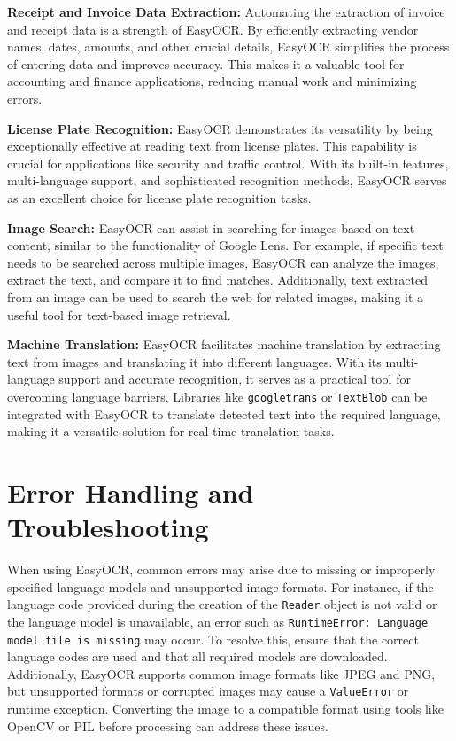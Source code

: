 \textbf{Receipt and Invoice Data Extraction:} Automating the extraction of invoice and receipt data is a strength of EasyOCR. By efficiently extracting vendor names, dates, amounts, and other crucial details, EasyOCR simplifies the process of entering data and improves accuracy. This makes it a valuable tool for accounting and finance applications, reducing manual work and minimizing errors.

\textbf{License Plate Recognition:} EasyOCR demonstrates its versatility by being exceptionally effective at reading text from license plates. This capability is crucial for applications like security and traffic control. With its built-in features, multi-language support, and sophisticated recognition methods, EasyOCR serves as an excellent choice for license plate recognition tasks. \cite{Mahajan:2023} 

\textbf{Image Search:} EasyOCR can assist in searching for images based on text content, similar to the functionality of Google Lens. For example, if specific text needs to be searched across multiple images, EasyOCR can analyze the images, extract the text, and compare it to find matches. Additionally, text extracted from an image can be used to search the web for related images, making it a useful tool for text-based image retrieval.

\textbf{Machine Translation:} EasyOCR facilitates machine translation by extracting text from images and translating it into different languages. With its multi-language support and accurate recognition, it serves as a practical tool for overcoming language barriers. Libraries like \texttt{googletrans} or \texttt{TextBlob} can be integrated with EasyOCR to translate detected text into the required language, making it a versatile solution for real-time translation tasks.\cite{Mahajan:2023} 


\section{Error Handling and Troubleshooting}

When using EasyOCR, common errors may arise due to missing or improperly specified language models and unsupported image formats. For instance, if the language code provided during the creation of the \texttt{Reader} object is not valid or the language model is unavailable, an error such as \texttt{RuntimeError: Language model file is missing} may occur. To resolve this, ensure that the correct language codes are used and that all required models are downloaded. Additionally, EasyOCR supports common image formats like JPEG and PNG, but unsupported formats or corrupted images may cause a \texttt{ValueError} or runtime exception. Converting the image to a compatible format using tools like OpenCV or PIL before processing can address these issues.

